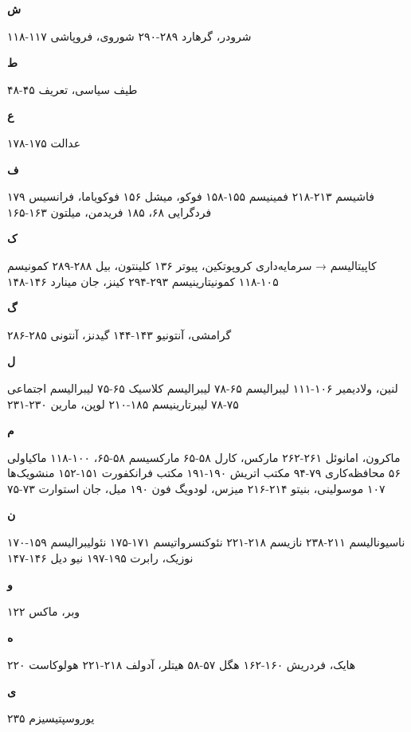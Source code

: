 \textbf{ش}

شرودر، گرهارد ۲۸۹-۲۹۰
شوروی، فروپاشی ۱۱۷-۱۱۸

\textbf{ط}

طیف سیاسی، تعریف ۴۵-۴۸

\textbf{ع}

عدالت ۱۷۵-۱۷۸

\textbf{ف}

فاشیسم ۲۱۳-۲۱۸
فمینیسم ۱۵۵-۱۵۸
فوکو، میشل ۱۵۶
فوکویاما، فرانسیس ۱۷۹
فردگرایی ۶۸، ۱۸۵
فریدمن، میلتون ۱۶۳-۱۶۵

\textbf{ک}

کاپیتالیسم → سرمایه‌داری
کروپوتکین، پیوتر ۱۳۶
کلینتون، بیل ۲۸۸-۲۸۹
کمونیسم ۱۰۵-۱۱۸
کمونیتارینیسم ۲۹۳-۲۹۴
کینز، جان مینارد ۱۴۶-۱۴۸

\textbf{گ}

گرامشی، آنتونیو ۱۴۳-۱۴۴
گیدنز، آنتونی ۲۸۵-۲۸۶

\textbf{ل}

لنین، ولادیمیر ۱۰۶-۱۱۱
لیبرالیسم ۶۵-۷۸
لیبرالیسم کلاسیک ۶۵-۷۵
لیبرالیسم اجتماعی ۷۵-۷۸
لیبرتارینیسم ۱۸۵-۲۱۰
لوپن، مارین ۲۳۰-۲۳۱

\textbf{م}

ماکرون، امانوئل ۲۶۱-۲۶۲
مارکس، کارل ۵۸-۶۵
مارکسیسم ۵۸-۶۵، ۱۰۰-۱۱۸
ماکیاولی ۵۶
محافظه‌کاری ۷۹-۹۴
مکتب اتریش ۱۹۰-۱۹۱
مکتب فرانکفورت ۱۵۱-۱۵۲
منشویک‌ها ۱۰۷
موسولینی، بنیتو ۲۱۴-۲۱۶
میزس، لودویگ فون ۱۹۰
میل، جان استوارت ۷۳-۷۵

\textbf{ن}

ناسیونالیسم ۲۱۱-۲۳۸
نازیسم ۲۱۸-۲۲۱
نئوکنسرواتیسم ۱۷۱-۱۷۵
نئولیبرالیسم ۱۵۹-۱۷۰
نوزیک، رابرت ۱۹۵-۱۹۷
نیو دیل ۱۴۶-۱۴۷

\textbf{و}

وبر، ماکس ۱۲۲

\textbf{ه}

هایک، فردریش ۱۶۰-۱۶۲
هگل ۵۷-۵۸
هیتلر، آدولف ۲۱۸-۲۲۱
هولوکاست ۲۲۰

\textbf{ی}

یوروسپتیسیزم ۲۳۵


